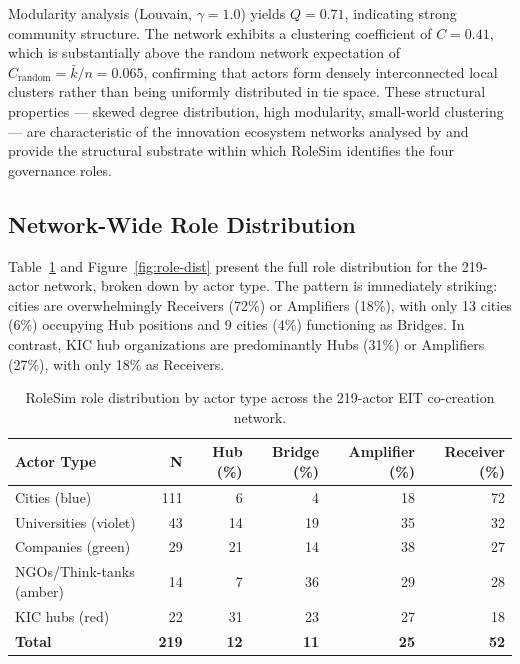 \documentclass[review,12pt]{elsarticle}
\begin{document}
Modularity analysis (Louvain, $\gamma = 1.0$) yields $Q = 0.71$, indicating strong community structure. The network exhibits a clustering coefficient of $C = 0.41$, which is substantially above the random network expectation of $C_{\text{random}} = \bar{k}/n = 0.065$, confirming that actors form densely interconnected local clusters rather than being uniformly distributed in tie space. These structural properties --- skewed degree distribution, high modularity, small-world clustering --- are characteristic of the innovation ecosystem networks analysed by \citet{basole2023computational} and provide the structural substrate within which RoleSim identifies the four governance roles.

\subsection{Network-Wide Role Distribution}

Table~\ref{tab:role-distribution} and Figure~\ref{fig:role-dist} present the full role distribution for the 219-actor network, broken down by actor type. The pattern is immediately striking: cities are overwhelmingly Receivers (72\%) or Amplifiers (18\%), with only 13 cities (6\%) occupying Hub positions and 9 cities (4\%) functioning as Bridges. In contrast, KIC hub organizations are predominantly Hubs (31\%) or Amplifiers (27\%), with only 18\% as Receivers.

\begin{table}[htbp]
\centering
\caption{RoleSim role distribution by actor type across the 219-actor EIT co-creation network.}
\label{tab:role-distribution}
\small
\begin{tabular}{@{}lrrrrr@{}}
\toprule
\textbf{Actor Type} & \textbf{N} & \textbf{Hub (\%)} & \textbf{Bridge (\%)} & \textbf{Amplifier (\%)} & \textbf{Receiver (\%)} \\
\midrule
Cities (blue)         & 111 & 6  & 4  & 18 & 72 \\
Universities (violet) & 43  & 14 & 19 & 35 & 32 \\
Companies (green)     & 29  & 21 & 14 & 38 & 27 \\
NGOs/Think-tanks (amber) & 14 & 7 & 36 & 29 & 28 \\
KIC hubs (red)        & 22  & 31 & 23 & 27 & 18 \\
\midrule
\textbf{Total}        & \textbf{219} & \textbf{12} & \textbf{11} & \textbf{25} & \textbf{52} \\
\bottomrule
\end{tabular}
\end{table}
\end{document}
